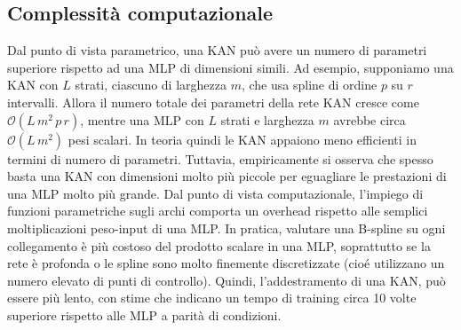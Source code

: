 \documentclass[a4paper,12pt]{report}
\begin{document}
	\subsection{Complessità computazionale}
	Dal punto di vista parametrico, una KAN può avere un numero di parametri superiore rispetto ad una MLP di dimensioni simili. Ad esempio, supponiamo una KAN con $L$ strati, ciascuno di larghezza $m$, che usa spline di ordine $p$ su $r$ intervalli. Allora il numero totale dei parametri della rete KAN cresce come $\mathcal{O}(L\,m^2\,p\,r)$, mentre una MLP con $L$ strati e larghezza $m$ avrebbe circa $\mathcal{O}(L\,m^2)$ pesi scalari. In teoria quindi le KAN appaiono meno efficienti in termini di numero di parametri. Tuttavia, empiricamente si osserva che spesso basta una KAN con dimensioni molto più piccole per eguagliare le prestazioni di una MLP molto più grande. Dal punto di vista computazionale, l’impiego di funzioni parametriche sugli archi comporta un overhead rispetto alle semplici moltiplicazioni peso-input di una MLP. In pratica, valutare una B-spline su ogni collegamento è più costoso del prodotto scalare in una MLP, soprattutto se la rete è profonda o le spline sono molto finemente discretizzate (cioé utilizzano un numero elevato di punti di controllo). Quindi, l'addestramento di una KAN, può essere più lento, con stime che indicano un tempo di training circa 10 volte superiore rispetto alle MLP a parità di condizioni.
	
\end{document}
